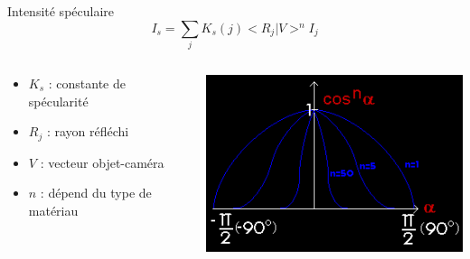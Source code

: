 \begin{frame}[t]{Intensité spéculaire}
  $$ I_s = \sum_j K_s(j) < R_j | V >^n I_j $$
  \begin{columns}
    \begin{column}{.59\textwidth}
      \begin{itemize}
        \item $K_s$ : constante de spécularité
        \item $R_j$ : rayon réfléchi
        \item $V$ : vecteur objet-caméra
        \item $n$ : dépend du type de matériau
      \end{itemize}
    \end{column}
    \begin{column}{.39\textwidth}
      \includegraphics[width=\textwidth]{figs/cosn.png} \\

    \end{column}
  \end{columns}
\end{frame}

